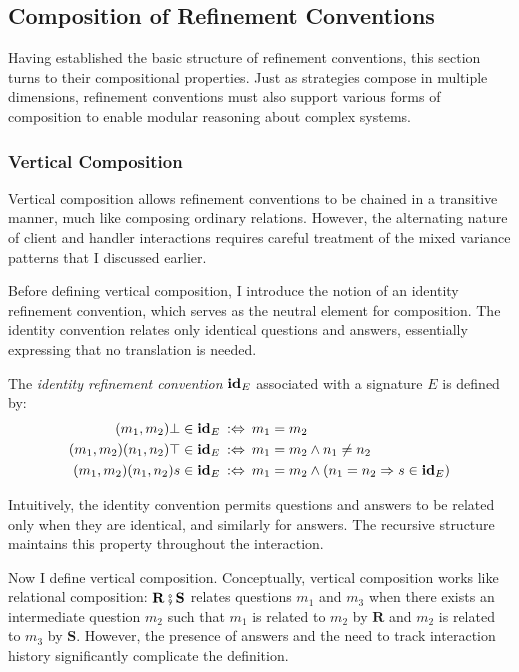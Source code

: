 \subsection{Composition of Refinement Conventions}

Having established the basic structure of refinement conventions,
this section turns to their compositional properties.
Just as strategies compose in multiple dimensions,
refinement conventions must also support various forms of composition
to enable modular reasoning about complex systems.

\subsubsection{Vertical Composition}

Vertical composition allows refinement conventions
to be chained
in a transitive manner,
much like composing ordinary relations.
However, the alternating nature of client and handler interactions
requires careful treatment of the mixed variance patterns
that I discussed earlier.

Before defining vertical composition,
I introduce the notion of an identity refinement convention,
which serves as the neutral element for composition.
The identity convention relates only identical questions and answers,
essentially expressing that no translation is needed.

\begin{definition}
  The \emph{identity refinement convention} $\mathbf{id}_E$
  associated with a signature $E$ is defined by:
  \begin{align*}
    (m_1, m_2) \bot \in \mathbf{id}_E &\::\Leftrightarrow\:
    m_1 = m_2 \\
    (m_1, m_2) (n_1, n_2) \top \in \mathbf{id}_E &\::\Leftrightarrow\:
    m_1 = m_2 \wedge n_1 \neq n_2 \\
    (m_1, m_2) (n_1, n_2) s \in \mathbf{id}_E &\::\Leftrightarrow\:
    m_1 = m_2 \wedge (n_1 = n_2 \Rightarrow s \in \mathbf{id}_E)
  \end{align*}
\end{definition}
Intuitively, the identity convention permits questions
and answers to be related
only when they are identical,
and similarly for answers.
The recursive structure maintains this property throughout the interaction.

Now I define vertical composition.
Conceptually, vertical composition works like relational composition:
$\mathbf{R} \fatsemi \mathbf{S}$ relates
questions $m_1$ and $m_3$
when there exists an intermediate question $m_2$ such that
$m_1$ is related to $m_2$ by $\mathbf{R}$
and $m_2$ is related to $m_3$ by $\mathbf{S}$.
However, the presence of answers and the need to track interaction history
significantly complicate the definition.

